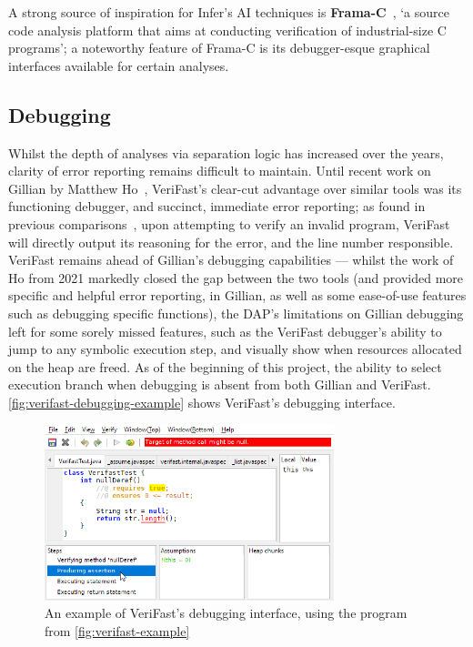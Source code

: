 A strong source of inspiration for Infer's AI techniques is
\textbf{Frama-C}~\cite{frama-c-paper, frama-c-site}, `a source code analysis
platform that aims at conducting verification of industrial-size C programs'; a
noteworthy feature of Frama-C is its debugger-esque graphical interfaces
available for certain analyses.


\subsection{Debugging}

Whilst the depth of analyses via separation logic has increased over the years,
clarity of error reporting remains difficult to maintain. Until recent work on
Gillian by Matthew Ho~\cite{gillian-debugging-2021}, VeriFast's clear-cut
advantage over similar tools was its functioning debugger, and succinct,
immediate error reporting; as found in previous
comparisons~\cite{gillian-logging-2020}, upon attempting to verify an invalid
program, VeriFast will directly output its reasoning for the error, and the line
number responsible. VeriFast remains ahead of Gillian's debugging capabilities
--- whilst the work of Ho from 2021 markedly closed the gap between the two
tools (and provided more specific and helpful error reporting, in Gillian, as
well as some ease-of-use features such as debugging specific functions),
the DAP's limitations on Gillian debugging left for some sorely missed features,
such as the VeriFast debugger's ability to jump to any symbolic execution step,
and visually show when resources allocated on the heap are freed. As of the
beginning of this project, the ability to select execution branch when debugging
is absent from both Gillian and VeriFast.
\autoref{fig:verifast-debugging-example} shows VeriFast's debugging interface.

\begin{figure}
  \centering
  \includegraphics[width=0.75\textwidth]{img/verifast-debugging-example.png}
  \caption{
    An example of VeriFast's debugging interface, using the program from
    \autoref{fig:verifast-example}
  }\label{fig:verifast-debugging-example}
\end{figure}

